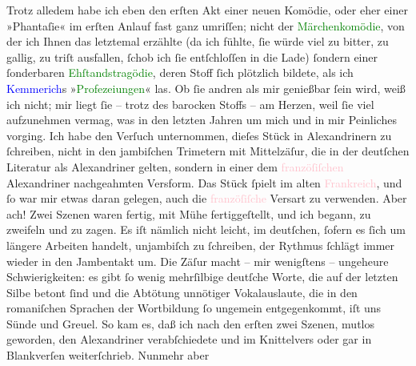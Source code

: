            \pstart
           Trotz alledem habe ich eben den erſten Akt einer neuen Komödie, oder eher einer
               »Phantaſie« im erſten Anlauf fast ganz umriſſen; nicht der \textcolor{green}{Märchenkomödie}{}, von der ich Ihnen das
               letztemal erzählte (da ich fühlte, ſie würde viel zu bitter, zu gallig, zu triſt
               ausfallen, ſchob ich ſie entſchloſſen in die Lade) ſondern einer ſonderbaren \textcolor{green}{Ehſtandstragödie}{}, deren Stoff ſich
               plötzlich bildete, als ich \textcolor{blue}{Kemmerich}{}\ledrightnote{\textcolor{blue}{Max Kemmerich}}s »\textcolor{green}{Profezeiungen}{}\ledrightnote{\textcolor{green}{Prophezeiungen – Wahn oder Wirklichkeit?}}« las. Ob ſie andren als mir genießbar
               ſein wird, weiß ich nicht; mir liegt ſie – trotz des ba{\pb}rocken Stoffs – am Herzen, weil ſie viel aufzunehmen vermag, was in den letzten
               Jahren um mich und in mir Peinliches vorging.\pend
           \pstart
           Ich habe den Verſuch unternommen, dieſes Stück in Alexandrinern zu ſchreiben, nicht
               in den jambiſchen Trimetern mit Mittelzäſur, die in der deutſchen Literatur als
               Alexandriner gelten, sondern in einer dem \textcolor{pink}{franzöſiſchen}{}\ledrightnote{\textcolor{pink}{Frankreich}} Alexandriner nachgeahmten Versform. Das Stück ſpielt im alten
                  \textcolor{pink}{Frankreich}{}\ledrightnote{\textcolor{pink}{Frankreich}}, und ſo war mir etwas daran gelegen,
               auch die \textcolor{pink}{franzöſiſche}{}\ledrightnote{\textcolor{pink}{Frankreich}} Versart zu verwenden. Aber
               ach! Zwei Szenen waren fertig, mit Mühe fertiggeſtellt, und ich begann, zu zweifeln
               und zu zagen. Es iſt nämlich nicht leicht, im deutſchen, ſofern es ſich um längere
               Arbeiten handelt, unjambiſch zu ſchreiben, der Rythmus ſchlägt immer wieder in den
               Jambentakt um. Die Zäſur macht – mir wenigſtens – ungeheure Schwierigkeiten: es gibt
               ſo wenig  mehrſilbige deutſche Worte, die auf
               der letzten Silbe betont {\pb}ſind und die Abtötung
               unnötiger Vokalauslaute, die in den romaniſchen Sprachen der Wortbildung ſo ungemein
                  entgegenkommt, iſt uns Sünde und Greuel. So kam
               es, daß ich nach den erſten zwei Szenen, mutlos geworden, den Alexandriner
               verabſchiedete und im Knittelvers oder gar in Blankverſen weiterſchrieb. Nunmehr aber
